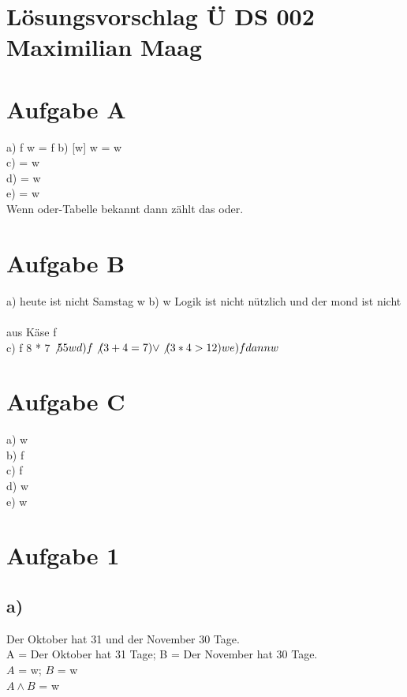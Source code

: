 \documentclass{article}
\begin{document}
	\section*{Lösungsvorschlag Ü DS 002 Maximilian Maag}
	\section*{Aufgabe A}
	a) f w = f
	b) [w] w = w \\
	c) = w \\
	d) = w \\
	e) = w \\
	
	Wenn oder-Tabelle bekannt dann zählt das oder.
	
	\section*{Aufgabe B}
	
	a) heute ist nicht Samstag w
	b) w Logik ist nicht nützlich und der mond ist nicht \\ \\ aus Käse f \\
	c) f 8 * 7 $\not 55 w \\
	d) f \not(3 + 4 = 7) \lor \not(3 * 4 > 12) w \\
	e) f  dann w$ \\
	
	\section*{Aufgabe C}
	
	a) w \\
	b) f \\
	c) f \\
	d) w \\
	e) w \\
	
	\section*{Aufgabe 1}
	\subsection*{a)}
	Der Oktober hat 31 und der November 30 Tage. \\
	A = Der Oktober hat 31 Tage; B = Der November hat 30 Tage. \\
	$A$ = w; $B$ = w \\
	$A \land B$ = w \\
\end{document}
